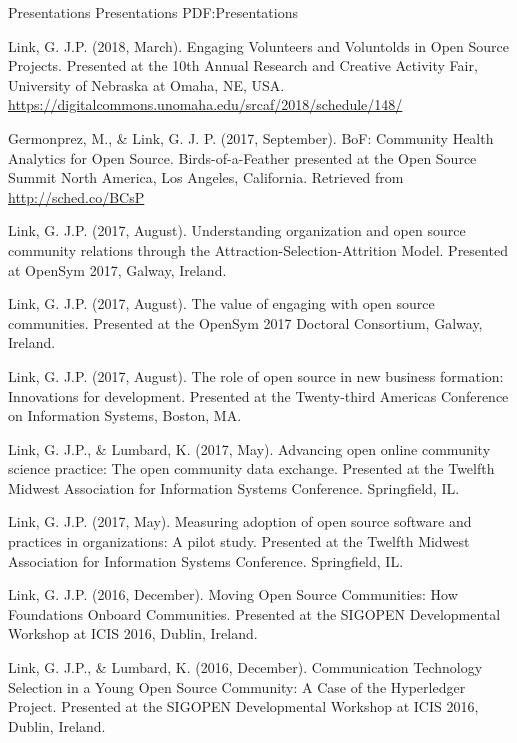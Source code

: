 \BigGap
\SubSection
{Presentations}
{Presentations}
{PDF:Presentations}

\begingroup
\renewcommand{\MaxNumberedItem}{[88]}

\Gap
\NumberedItem{[13]}
{
Link, G. J.P. (2018, March). Engaging Volunteers and Voluntolds in Open Source Projects. Presented at the 10th Annual Research and Creative Activity Fair, University of Nebraska at Omaha, NE, USA. \url{https://digitalcommons.unomaha.edu/srcaf/2018/schedule/148/}
}

\Gap
\NumberedItem{[12]}
{
Germonprez, M., \& Link, G. J. P. (2017, September). BoF: Community Health Analytics for Open Source. Birds-of-a-Feather presented at the Open Source Summit North America, Los Angeles, California. Retrieved from \url{http://sched.co/BCsP}
}

\Gap
\NumberedItem{[11]}
{
Link, G. J.P. (2017, August). Understanding organization and open source community relations through the Attraction-Selection-Attrition Model. Presented at OpenSym 2017, Galway, Ireland.
}

\Gap
\NumberedItem{[10]}
{
Link, G. J.P. (2017, August). The value of engaging with open source communities. Presented at the OpenSym 2017 Doctoral Consortium, Galway, Ireland.
}

\Gap
\NumberedItem{[9]}
{
Link, G. J.P. (2017, August). The role of open source in new business formation: Innovations for development. Presented at the Twenty-third Americas Conference on Information Systems, Boston, MA.
}

\Gap
\NumberedItem{[8]}
{
Link, G. J.P., \& Lumbard, K. (2017, May). Advancing open online community science practice: The open community data exchange. Presented at the Twelfth Midwest Association for Information Systems Conference. Springfield, IL.
}

\Gap
\NumberedItem{[7]}
{
Link, G. J.P. (2017, May). Measuring adoption of open source software and practices in organizations: A pilot study. Presented at the Twelfth Midwest Association for Information Systems Conference. Springfield, IL.
}

\Gap
\NumberedItem{[6]}
{
Link, G. J.P. (2016, December). Moving Open Source Communities:  How Foundations Onboard Communities. Presented at the SIGOPEN Developmental Workshop at ICIS 2016, Dublin, Ireland.
}

\Gap
\NumberedItem{[5]}
{
Link, G. J.P., \& Lumbard, K. (2016, December). Communication Technology Selection in a Young Open Source Community:  A Case of the Hyperledger Project. Presented at the SIGOPEN Developmental Workshop at ICIS 2016, Dublin, Ireland.
}

